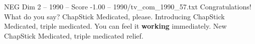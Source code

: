 \begin{textsample}{NEG Dim 2 – 1990 – Score -1.00 – 1990/tv\_com\_1990\_57.txt}  \label{ex:f2_neg_069}
Congratulations!
What do you say?
ChapStick Medicated, please.
Introducing ChapStick Medicated, triple medicated.
You can feel it \textbf{working} immediately.
New ChapStick Medicated, triple medicated relief.

\end{textsample}
